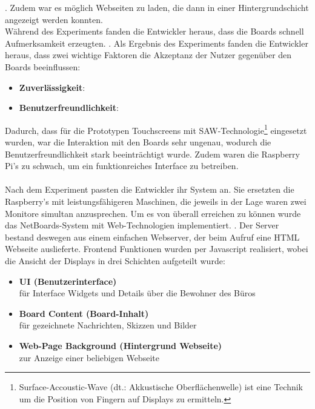 \cite{wood:2014}. Zudem war es möglich Webseiten zu laden, die dann in einer Hintergrundschicht angezeigt werden konnten.
\\
Während des Experiments fanden die Entwickler heraus, dass die Boards schnell Aufmerksamkeit erzeugten. \cite{wood:2014}.
Als Ergebnis des Experiments fanden die Entwickler heraus, dass zwei wichtige Faktoren die Akzeptanz der Nutzer gegenüber den Boards beeinflussen:
\begin{itemize}
  \item \textbf{Zuverlässigkeit}: \cite{wood:2014}
  \item \textbf{Benutzerfreundlichkeit}: \cite{wood:2014}
\end{itemize}
Dadurch, dass für die Prototypen Touchscreens mit SAW-Technologie\footnote{Surface-Accoustic-Wave (dt.: Akkustische Oberflächenwelle) ist eine Technik um die Position von Fingern auf Displays zu ermitteln.} eingesetzt wurden, war die Interaktion mit den Boards sehr ungenau, wodurch die Benutzerfreundlichkeit stark beeinträchtigt wurde.
Zudem waren die Raspberry Pi's zu schwach, um ein funktionreiches Interface zu betreiben.
\\
\\
Nach dem Experiment passten die Entwickler ihr System an.
Sie ersetzten die Raspberry's mit leistungsfähigeren Maschinen, die jeweils in der Lage waren zwei Monitore simultan anzusprechen.
Um es von überall erreichen zu können wurde das NetBoards-System mit Web-Technologien implementiert. \cite{wood:2014}.
Der Server bestand deswegen aus einem einfachen Webserver, der beim Aufruf eine HTML Webseite auslieferte. Frontend Funktionen wurden per Javascript realisiert, wobei die Ansicht der Displays in drei Schichten aufgeteilt wurde\cite{wood:2014}:
\begin{itemize}
  \item \textbf{UI (Benutzerinterface)}\\
    für Interface Widgets und Details über die Bewohner des Büros
  \item \textbf{Board Content (Board-Inhalt)}\\
    für gezeichnete Nachrichten, Skizzen und Bilder
  \item \textbf{Web-Page Background (Hintergrund Webseite)}\\
    zur Anzeige einer beliebigen Webseite
\end{itemize}
